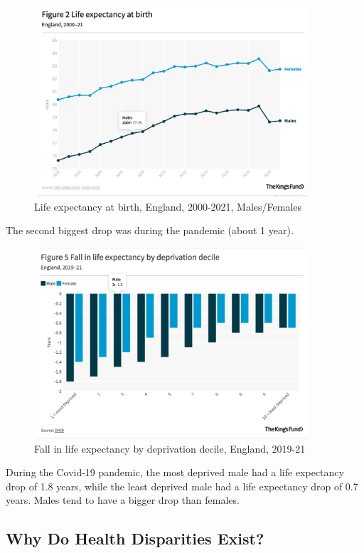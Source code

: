            \begin{figure}[H]
                \centering
                \includegraphics[width=4in]{images/ch3/32.png}
                \caption{Life expectancy at birth, England, 2000-2021, Males/Females}
            \end{figure}        
            The second biggest drop was during the pandemic (about 1 year). 
        
            \begin{figure}[H]
                \centering
                \includegraphics[width=4in]{images/ch3/33.png}
                \caption{Fall in life expectancy by deprivation decile, England, 2019-21}
            \end{figure}        
            During the Covid-19 pandemic, the most deprived male had a life expectancy drop of 1.8 years, while the least deprived male had a life expectancy drop of 0.7 years. Males tend to have a bigger drop than females. 

    \subsection{Why Do Health Disparities Exist?}\label{health_ineq_cause}

